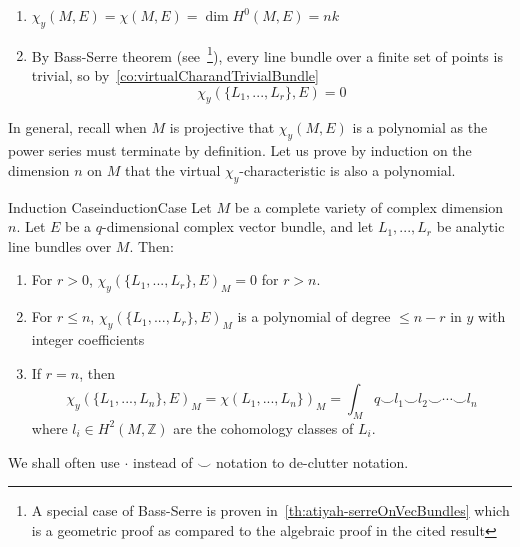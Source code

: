 \documentclass{book}
\newenvironment{Proof}[1][]
  {\begin{ProofTcb}[#1]}
  {\end{ProofTcb}}
\newcommand{\Z}{{\mathbb{Z}}}
\begin{document}
\begin{Proof}
  \begin{enumerate}
    \item $\chi_y(M, E) = \chi(M,E) = \dim H^0(M, E) = nk$
    \item By Bass-Serre theorem (see~\cite{NateKTheory}\footnote{A special case of
      Bass-Serre is proven in~\cref{th:atiyah-serreOnVecBundles} which is a geometric proof as compared to the
    algebraic proof in the cited result}), every line bundle over a finite set of points is trivial, so by~\cref{co:virtualCharandTrivialBundle}
    \[
      \chi_y(\{L_1, ..., L_r\}, E) = 0
    \]
  \end{enumerate}
\end{Proof}


In general, recall when $M$ is projective that $\chi_y(M,E)$ is a polynomial as the power series must terminate by definition. Let us prove by
induction on the dimension $n$ on $M$ that the virtual $\chi_y$-characteristic is also a polynomial.

\begin{thm}{Induction Case}{inductionCase}
  Let $M$ be a complete variety of complex dimension $n$. Let $E$ be a $q$-dimensional complex vector
  bundle, and let $L_1, ..., L_r$ be analytic line bundles over $M$. Then:
  \begin{enumerate}
    \item For $r > 0$, $\chi_y(\{L_1, ..., L_r\}, E)_M = 0$ for $r > n$.
    \item For $r \le n$, $\chi_y(\{L_1, ..., L_r\}, E)_M$ is a polynomial of degree $\le n-r$ in $y$ with
      integer coefficients
     \item If $r = n$, then
       \[
       \chi_y(\{L_1, ..., L_n\}, E)_M = \chi(L_1, ..., L_n\})_M = \int_M q\smile l_1\smile l_2\smile \cdots \smile
       l_n
       \]
       where $l_i \in H^2(M, \Z)$ are the cohomology classes of $L_i$.
  \end{enumerate}
\end{thm}
We shall often use $\cdot$ instead of $\smile$ notation to de-clutter notation.
\end{document}
